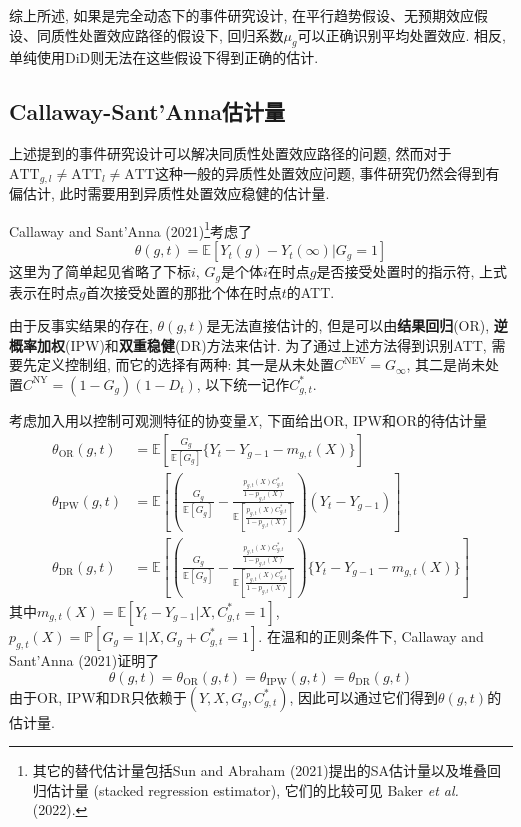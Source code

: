 \documentclass[cn,sakura,14pt,screen,bibstyle=gb7714-2015,math=mtpro2]{elegantnote}
\newcommand{\E}{\mathbb{E}}
\newcommand{\X}{X}
\begin{document}
综上所述, 如果是完全动态下的事件研究设计, 在平行趋势假设、无预期效应假设、同质性处置效应路径的假设下, 回归系数$\mu_g$可以正确识别平均处置效应. 相反, 单纯使用DiD则无法在这些假设下得到正确的估计.


\subsection{Callaway-Sant'Anna估计量}
上述提到的事件研究设计可以解决同质性处置效应路径的问题, 然而对于$\text{ATT}_{g,l}\neq\text{ATT}_l\ne\text{ATT}$这种一般的异质性处置效应问题, 事件研究仍然会得到有偏估计, 此时需要用到异质性处置效应稳健的估计量.

Callaway and Sant'Anna (2021)\footnote{其它的替代估计量包括Sun and Abraham (2021)提出的SA估计量以及堆叠回归估计量 (stacked regression estimator), 它们的比较可见 Baker \emph{et al.} (2022).}考虑了
$$\theta(g,t)=\E[Y_{t}(g)-Y_{t}(\infty)|G_g=1]$$
这里为了简单起见省略了下标$i$, $G_g$是个体$i$在时点$g$是否接受处置时的指示符, 上式表示在时点$g$首次接受处置的那批个体在时点$t$的ATT.

由于反事实结果的存在, $\theta(g,t)$是无法直接估计的, 但是可以由\textbf{结果回归}(OR), \textbf{逆概率加权}(IPW)和\textbf{双重稳健}(DR)方法来估计. 为了通过上述方法得到识别ATT, 需要先定义控制组, 而它的选择有两种: 其一是从未处置$C^\text{NEV}=G_\infty$, 其二是尚未处置$C^\text{NY}=(1-G_g)(1-D_t)$, 以下统一记作$C_{g,t}^\ast$.

考虑加入用以控制可观测特征的协变量$\X$, 下面给出OR, IPW和OR的待估计量
\begin{align*}
\theta_\text{OR}(g,t)&=\E\left[\frac{G_g}{\E[G_g]}\{Y_t-Y_{g-1}-m_{g,t}({X})\}\right] \\
\theta_\text{IPW}(g,t)&=\E\left[\left(\frac{G_g}{\E[G_g]}-\frac{\frac{p_{g,t}(\X)C_{g,t}^\ast}{1-p_{g,t}(\X)}}{\E\left[\frac{p_{g,t}(\X)C_{g,t}^\ast}{1-p_{g,t}(\X)}\right]}\right)(Y_t-Y_{g-1})\right] \\
\theta_{\text{DR}}(g,t)&=\E\left[\left(\frac{G_g}{\E[G_g]}-\frac{\frac{p_{g,t}(\X)C_{g,t}^\ast}{1-p_{g,t}(\X)}}{\E\left[\frac{p_{g,t}(\X)C_{g,t}^\ast}{1-p_{g,t}(\X)}\right]}\right)\{Y_t-Y_{g-1}-m_{g,t}(\X)\}\right]
\end{align*}
其中$m_{g,t}(X)=\E[Y_t-Y_{g-1}|X,C_{g,t}^\ast=1]$, $p_{g,t}(X)=\mathbb{P}[G_g=1|X,G_g+C_{g,t}^\ast=1]$. 在温和的正则条件下, Callaway and Sant'Anna (2021)证明了
$$\theta(g,t)=\theta_\text{OR}(g,t)=\theta_\text{IPW}(g,t)=\theta_\text{DR}(g,t)$$
由于OR, IPW和DR只依赖于$(Y,X,G_g,C_{g,t}^\ast)$, 因此可以通过它们得到$\theta(g,t)$的估计量.
\end{document}
